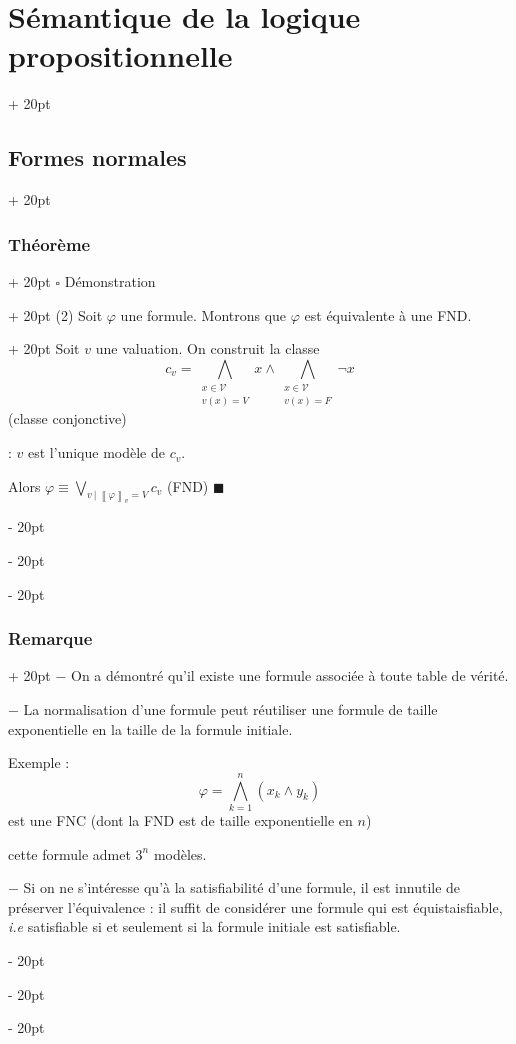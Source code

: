 \documentclass[a4paper, 12pt, twoside]{article}
\newcommand{\lrbb}[1]{\left\llbracket #1 \right\rrbracket}
\newcommand{\ind}[1][20pt]{\advance\leftskip + #1}
\newcommand{\deind}[1][20pt]{\advance\leftskip - #1}
\newenvironment{indt}[2][20pt]{#2 \par \ind[#1]}{\par \deind} %
\begin{document}
\begin{indt}{\section{Sémantique de la logique propositionnelle}}
\begin{indt}{\subsection{Formes normales}}
\begin{indt}{\subsubsection{Théorème}}
\begin{indt}{$\square$ Démonstration}
                    \begin{indt}{(2) Soit $\varphi$ une formule. Montrons que $\varphi$ est équivalente à une FND.}
                        Soit $v$ une valuation. On construit la classe
                            \[ c_v = \bigwedge_{\substack{x \in \mathcal V \\ v(x) = V}} x \wedge \bigwedge_{\substack{x \in \mathcal V \\ v(x) = F}} \neg x \]
                        (classe conjonctive)
                        
                         : $v$ est l'unique modèle de $c_v$.
                        
                        \vspace{12pt}
                        
                        Alors $\varphi \equiv \displaystyle \bigvee_{v\ |\ \lrbb{\varphi}_v = V} c_v$ (FND) $\blacksquare$
                    \end{indt}
                \end{indt}
            \end{indt}
            
            \vspace{12pt}
            
            \begin{indt}{\subsubsection{Remarque}}
                $-$ On a démontré qu'il existe une formule associée à toute
                table de vérité.
                
                $-$ La normalisation d'une formule peut réutiliser une formule de taille exponentielle en la taille de la formule initiale.
                
                Exemple :
                    \[ \varphi = \bigwedge_{k = 1}^n (x_k \wedge y_k) \]
                est une FNC (dont la FND est de taille exponentielle en $n$)
                
                 cette formule admet $3^n$ modèles.
                
                \vspace{12pt}
                
                $-$ Si on ne s'intéresse qu'à la satisfiabilité d'une formule, il est innutile de préserver l'équivalence : il suffit de considérer une formule qui est équistaisfiable, \textit{i.e} satisfiable si et seulement si la formule initiale est satisfiable.
            \end{indt}
            

\end{indt}
\end{indt}
\end{document}
